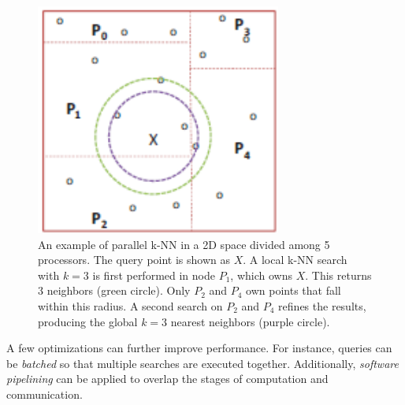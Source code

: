 \documentclass[12pt]{book}
\begin{document}
\begin{figure}[ht]
    \centering
    \includegraphics[width=0.55\linewidth]{images/pllML.png}
    \caption{An example of parallel k-NN in a 2D space divided among 5 processors. The query point is shown as $X$. A local k-NN search with $k=3$ is first performed in node $P_1$, which owns $X$. This returns 3 neighbors (green circle). Only $P_2$ and $P_4$ own points that fall within this radius. A second search on $P_2$ and $P_4$ refines the results, producing the global $k=3$ nearest neighbors (purple circle).}
    \label{fig:examplKNN}
\end{figure}

A few optimizations can further improve performance. For instance, queries can be \textit{batched} so that multiple searches are executed together. Additionally, \textit{software pipelining} can be applied to overlap the stages of computation and communication.  
\end{document}
